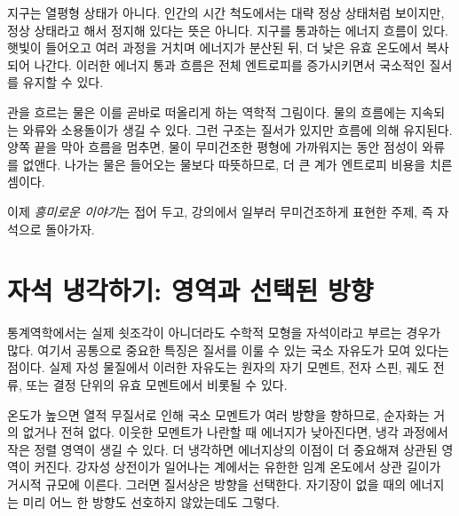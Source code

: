 지구는 열평형 상태가 아니다. 인간의 시간 척도에서는 대략 정상 상태처럼 보이지만, 정상 상태라고 해서 정지해 있다는 뜻은 아니다. 지구를 통과하는 에너지 흐름이 있다. 햇빛이 들어오고 여러 과정을 거치며 에너지가 분산된 뒤, 더 낮은 유효 온도에서 복사되어 나간다. 이러한 에너지 통과 흐름은 전체 엔트로피를 증가시키면서 국소적인 질서를 유지할 수 있다.

관을 흐르는 물은 이를 곧바로 떠올리게 하는 역학적 그림이다. 물의 흐름에는 지속되는 와류와 소용돌이가 생길 수 있다. 그런 구조는 질서가 있지만 흐름에 의해 유지된다. 양쪽 끝을 막아 흐름을 멈추면, 물이 무미건조한 평형에 가까워지는 동안 점성이 와류를 없앤다. 나가는 물은 들어오는 물보다 따뜻하므로, 더 큰 계가 엔트로피 비용을 치른 셈이다.

\begin{classroomqa}
\end{classroomqa}

이제 \emph{흥미로운 이야기}는 접어 두고, 강의에서 일부러 무미건조하게 표현한 주제, 즉 자석으로 돌아가자.

\section{자석 냉각하기: 영역과 선택된 방향}

통계역학에서는 실제 쇳조각이 아니더라도 수학적 모형을 자석이라고 부르는 경우가 많다. 여기서 공통으로 중요한 특징은 질서를 이룰 수 있는 국소 자유도가 모여 있다는 점이다. 실제 자성 물질에서 이러한 자유도는 원자의 자기 모멘트, 전자 스핀, 궤도 전류, 또는 결정 단위의 유효 모멘트에서 비롯될 수 있다.

온도가 높으면 열적 무질서로 인해 국소 모멘트가 여러 방향을 향하므로, 순자화는 거의 없거나 전혀 없다. 이웃한 모멘트가 나란할 때 에너지가 낮아진다면, 냉각 과정에서 작은 정렬 영역이 생길 수 있다. 더 냉각하면 에너지상의 이점이 더 중요해져 상관된 영역이 커진다. 강자성 상전이가 일어나는 계에서는 유한한 임계 온도에서 상관 길이가 거시적 규모에 이른다. 그러면 질서상은 방향을 선택한다. 자기장이 없을 때의 에너지는 미리 어느 한 방향도 선호하지 않았는데도 그렇다.

